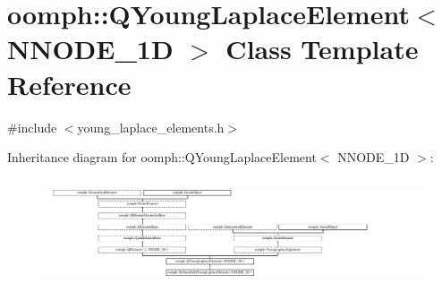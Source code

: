 \hypertarget{classoomph_1_1QYoungLaplaceElement}{}\section{oomph\+:\+:Q\+Young\+Laplace\+Element$<$ N\+N\+O\+D\+E\+\_\+1D $>$ Class Template Reference}
\label{classoomph_1_1QYoungLaplaceElement}


{\ttfamily \#include $<$young\+\_\+laplace\+\_\+elements.\+h$>$}

Inheritance diagram for oomph\+:\+:Q\+Young\+Laplace\+Element$<$ N\+N\+O\+D\+E\+\_\+1D $>$\+:\begin{figure}[H]
\begin{center}
\leavevmode
\includegraphics[height=3.190883cm]{classoomph_1_1QYoungLaplaceElement}
\end{center}
\end{figure}
